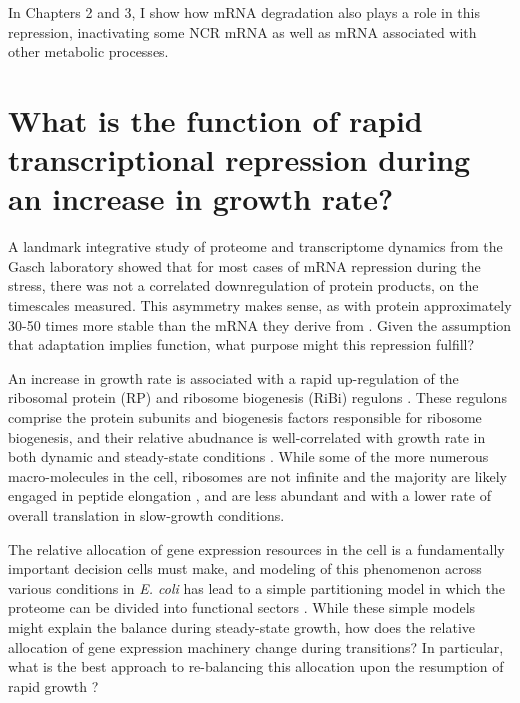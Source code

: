 In Chapters 2 and 3, I show how mRNA
degradation also plays a role in this repression, inactivating some
NCR mRNA as well as mRNA associated with other metabolic processes.

\section{What is the function of rapid transcriptional repression
during an increase in growth rate?}

A landmark integrative study of proteome and transcriptome dynamics 
from the Gasch laboratory \parencite{lee2011dynamic} showed that
for most cases of mRNA repression during the stress, there was not
a correlated downregulation of protein products, 
on the timescales measured.
This asymmetry makes sense, as with protein approximately 30-50 times
more stable than the mRNA they derive from 
\parencite{christiano2014global}. 
Given the assumption that adaptation implies function, what purpose
might this repression fulfill?

An increase in growth rate is associated with a rapid
up-regulation of the ribosomal protein (RP)
and ribosome biogenesis (RiBi) regulons
\parencite{griffioen1996ribosomal,jorgensen2004dynamic}. 
These regulons comprise the protein subunits and biogenesis factors
responsible for ribosome biogenesis, and their relative abudnance 
is well-correlated with 
growth rate in both dynamic and steady-state conditions 
\parencite{brauer2008coordination,airoldi2009predicting}.
While some of the more numerous macro-molecules in the cell, 
ribosomes are not infinite and the majority are likely engaged in 
peptide elongation
\parencite{shah2013rate,von2008quantitative,boehlke1975cellular},
and are less abundant 
\parencite{kief1981coordinate,powers1999regulation}
and with a lower rate of overall translation
\parencite{waldron1977evidence}
in slow-growth conditions.

The relative allocation of gene expression resources in the cell is a
fundamentally important decision cells must make, and modeling
of this phenomenon across various conditions in \textit{E. coli} has
lead to a simple partitioning model in which the proteome can be
divided into functional sectors
\parencite{scott2010interdependence,scott2014emergence}.
While these simple models might explain the balance during
steady-state growth, how does the relative allocation of gene
expression machinery change during transitions?
In particular, what is the best approach to re-balancing this
allocation upon the resumption of rapid growth
\parencite{erikson2017global}?


